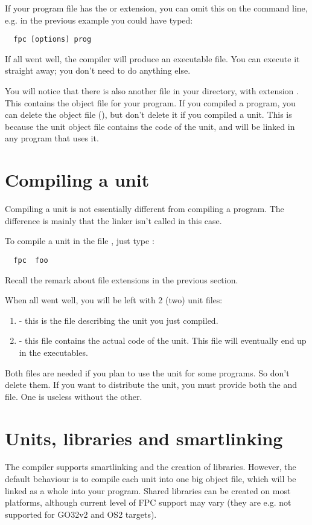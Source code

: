 If your program file has the  or  extension,
you can omit this on the command line, e.g. in the previous example you
could have typed:
\begin{verbatim}
  fpc [options] prog
\end{verbatim}

If all went well, the compiler will produce an executable file. You can execute 
it straight away; you don't need to do anything else. 

You will notice that there is also another file in your directory, with
extension . This contains the object file for your program.
If you compiled a program, you can delete the object file (),
but don't delete it if you compiled a unit. This is because
the unit object file contains the code of the unit, and will be
linked in any program that uses it.



\section{Compiling a unit}

Compiling a unit is not essentially different from compiling a program.
The difference is mainly that the linker isn't called in this case.

To compile a unit in the file , just type :
\begin{verbatim}
  fpc  foo
\end{verbatim}
Recall the remark about file extensions in the previous section.

When all went well, you will be left with 2 (two) unit files:
\begin{enumerate}
\item {} - this is the file describing the unit you just
compiled.
\item {} - this file contains the actual code of the unit.
This file will eventually end up in the executables.
\end{enumerate}
Both files are needed if you plan to use the unit for some programs.
So don't delete them. If you want to distribute the unit, you must
provide both the  and  file. One is useless without the
other.

\section{Units, libraries and smartlinking}
The \fpc compiler supports smartlinking and the creation of libraries.
However, the default behaviour is to compile each unit into one big object
file, which will be linked as a whole into your program.
Shared libraries can be created on most platforms, although current level
of FPC support may vary (they are e.g. not supported for GO32v2 and OS2
targets).

